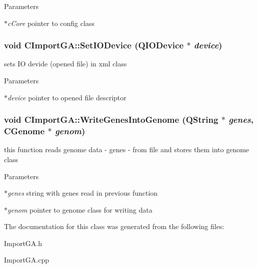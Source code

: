 \begin{DoxyParams}{Parameters}
\item[{\em $\ast$cCore}]pointer to config class \end{DoxyParams}
\hypertarget{classCImportGA_a1e777dd84da02e20b2dccb8e90423082}{
\subsubsection[{SetIODevice}]{\setlength{\rightskip}{0pt plus 5cm}void CImportGA::SetIODevice (QIODevice $\ast$ {\em device})}}
\label{classCImportGA_a1e777dd84da02e20b2dccb8e90423082}
sets IO devide (opened file) in xml class


\begin{DoxyParams}{Parameters}
\item[{\em $\ast$device}]pointer to opened file descriptor \end{DoxyParams}
\hypertarget{classCImportGA_a034ce47fefb46cc7e87f225909b2ab92}{
\subsubsection[{WriteGenesIntoGenome}]{\setlength{\rightskip}{0pt plus 5cm}void CImportGA::WriteGenesIntoGenome (QString $\ast$ {\em genes}, \/  {\bf CGenome} $\ast$ {\em genom})}}
\label{classCImportGA_a034ce47fefb46cc7e87f225909b2ab92}
this function reads genome data -\/ genes -\/ from file and stores them into genome class


\begin{DoxyParams}{Parameters}
\item[{\em $\ast$genes}]string with genes read in previous function \item[{\em $\ast$genom}]pointer to genome class for writing data \end{DoxyParams}


The documentation for this class was generated from the following files:\begin{DoxyCompactItemize}
\item 
ImportGA.h\item 
ImportGA.cpp\end{DoxyCompactItemize}
